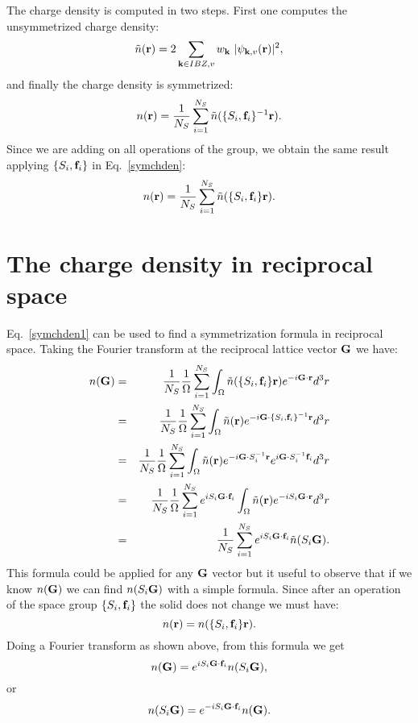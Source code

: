 \documentclass[12pt,a4paper,twoside]{report}
\begin{document}
The charge density is computed in two steps. First one computes the unsymmetrized charge density:
\begin{equation}
\tilde n({\bf r}) = 2 \sum_{{\bf k}\in IBZ , v} w_{\bf k}\ |\psi_{{\bf k}, v} ({\bf r}) |^2,
\label{unsymchden}
\end{equation}
and finally the charge density is symmetrized:
\begin{equation}
n({\bf r}) = {1 \over N_S} \sum_{i=1}^{N_S} \tilde n ( \{S_i,{\bf f}_i\}^{-1} {\bf r}).
\label{symchden}
\end{equation}
Since we are adding on all operations of the group, we obtain the same result applying $\{S_i,{\bf f}_i\}$ in Eq.~\ref{symchden}:
\begin{equation}
n({\bf r}) = {1 \over N_S} \sum_{i=1}^{N_S} \tilde n ( \{S_i,{\bf f}_i\} {\bf r}).
\label{symchden1}
\end{equation}

\section{The charge density in reciprocal space}
Eq.~\ref{symchden1} can be used to find a symmetrization formula in reciprocal space. Taking the Fourier transform at the reciprocal lattice vector ${\bf G}$ we have:
\begin{eqnarray}
n({\bf G}) &=& {1\over N_S} {1\over \Omega}
\sum_{i=1}^{N_S} \int_{\Omega} \tilde n ( \{S_i,{\bf f}_i\} {\bf r}) e^{-i{\bf G} \cdot {\bf r}} d^3r\nonumber \\
&=&{1\over N_S} {1\over \Omega}
\sum_{i=1}^{N_S} \int_{\Omega} \tilde n ({\bf r}) e^{-i{\bf G} \cdot \{S_i,{\bf f}_i\}^{-1}{\bf r}} d^3r \nonumber \\
&=&{1\over N_S} {1\over \Omega}
\sum_{i=1}^{N_S} \int_{\Omega} \tilde n ({\bf r}) e^{-i{\bf G} \cdot S_i^{-1}{\bf r}} e^{i{\bf G} \cdot S_i^{-1}{\bf f}_i} d^3r \nonumber \\
&=&{1\over N_S} {1\over \Omega}
\sum_{i=1}^{N_S} e^{iS_i {\bf G} \cdot {\bf f}_i} \int_{\Omega} \tilde n ({\bf r}) e^{-iS_i {\bf G} \cdot {\bf r}} d^3r \nonumber \\
&=&{1\over N_S}
\sum_{i=1}^{N_S} e^{iS_i {\bf G} \cdot {\bf f}_i}  \tilde n (S_i{\bf G}). 
\label{symng}
\end{eqnarray}
This formula could be applied for any ${\bf G}$ vector but it useful to observe that if we know $n({\bf G})$ we can find
$n(S_i{\bf G})$ with a simple formula.
Since after an operation of the space group $\{S_i,{\bf f}_i\}$ the solid does not change we must have:
\begin{equation}
n({\bf r})=n(\{S_i,{\bf f}_i\}{\bf r}).
\end{equation}
Doing a Fourier transform as shown above, from this formula we get
\begin{equation}
 n({\bf G})= e^{iS_i {\bf G} \cdot {\bf f}_i} n (S_i{\bf G}), 
\end{equation}
or 
\begin{equation}
 n(S_i{\bf G})= e^{-iS_i {\bf G} \cdot {\bf f}_i} n ({\bf G}). 
 \label{ngdist}
\end{equation}
\end{document}
